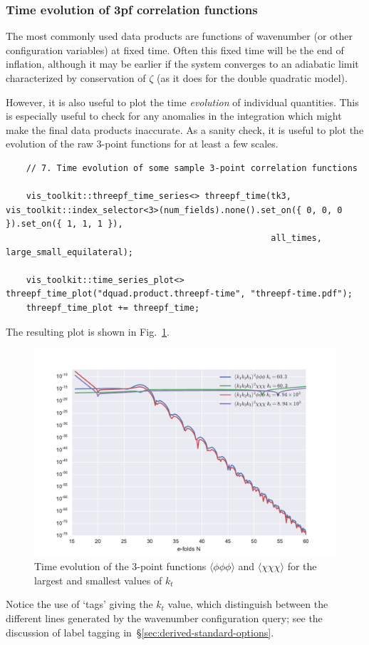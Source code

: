 \documentclass[11pt,a4paper]{article}
\begin{document}
\subsubsection{Time evolution of 3pf correlation functions}
The most commonly used data products
are functions of wavenumber (or other configuration variables)
at fixed time. Often this fixed time will be the end of inflation,
although it may be earlier if the system converges to an adiabatic
limit characterized by conservation of $\zeta$ (as it does for the double quadratic model).

However, it is also useful to plot the time \emph{evolution} of individual
quantities. This is especially useful to check for any anomalies in the integration
which might make the final data products inaccurate.
As a sanity check, it is useful to plot the evolution of the raw 3-point
functions for at least a few scales.
\begin{verbatim}
    // 7. Time evolution of some sample 3-point correlation functions

    vis_toolkit::threepf_time_series<> threepf_time(tk3, vis_toolkit::index_selector<3>(num_fields).none().set_on({ 0, 0, 0 }).set_on({ 1, 1, 1 }),
                                                    all_times, large_small_equilateral);

    vis_toolkit::time_series_plot<> threepf_time_plot("dquad.product.threepf-time", "threepf-time.pdf");
    threepf_time_plot += threepf_time;    
\end{verbatim}
The resulting plot is shown in Fig.~\ref{fig:threepf-time}.
\begin{figure}
    \begin{center}
        \includegraphics[scale=0.75]{Outputs/threepf-time}    
    \end{center}
    \caption{\label{fig:threepf-time}Time evolution of the
    3-point functions $\langle \phi \phi \phi \rangle$
    and $\langle \chi \chi \chi \rangle$ for the largest and smallest values of $k_t$}
\end{figure}
Notice the use of `tags' giving the $k_t$ value, which distinguish between the
different lines generated by the wavenumber configuration query;
see the discussion of label tagging in~\S\ref{sec:derived-standard-options}.
\end{document}
